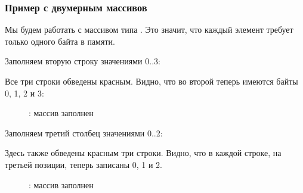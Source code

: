 \subsubsection{Пример с двумерным массивов}

Мы будем работать с массивом типа \Tchar. Это значит, что каждый элемент требует
только одного байта в памяти.

\myindex{\olly}

Заполняем вторую строку значениями 0..3:



Все три строки обведены красным. 
Видно, что во второй теперь имеются байты 0, 1, 2 и 3:

\begin{figure}[H]
\centering
\ifdefined\ebook
{}
\else
{}
\fi
\caption{\olly: массив заполнен}
\end{figure}

\myindex{\olly}

Заполняем третий столбец значениями 0..2:



Здесь также обведены красным три строки. 
Видно, что в каждой строке, на третьей позиции, теперь записаны 0, 1 и 2.

\begin{figure}[H]
\centering
\ifdefined\ebook
{}
\else
{}
\fi
\caption{\olly: массив заполнен}
\end{figure}
